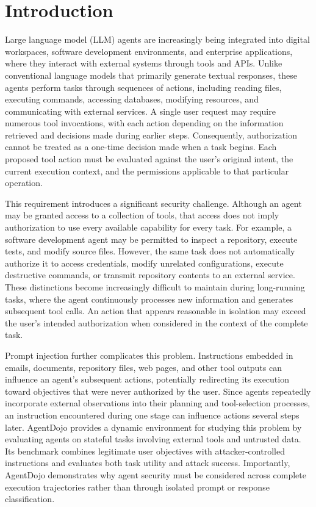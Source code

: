 \documentclass[10pt,conference]{IEEEtran}
\begin{document}
\section{Introduction}
Large language model (LLM) agents are increasingly being integrated into digital workspaces, software development environments, and enterprise applications, where they interact with external systems through tools and APIs. Unlike conventional language models that primarily generate textual responses, these agents perform tasks through sequences of actions, including reading files, executing commands, accessing databases, modifying resources, and communicating with external services. A single user request may require numerous tool invocations, with each action depending on the information retrieved and decisions made during earlier steps. Consequently, authorization cannot be treated as a one-time decision made when a task begins. Each proposed tool action must be evaluated against the user's original intent, the current execution context, and the permissions applicable to that particular operation.

This requirement introduces a significant security challenge. Although an agent may be granted access to a collection of tools, that access does not imply authorization to use every available capability for every task. For example, a software development agent may be permitted to inspect a repository, execute tests, and modify source files. However, the same task does not automatically authorize it to access credentials, modify unrelated configurations, execute destructive commands, or transmit repository contents to an external service. These distinctions become increasingly difficult to maintain during long-running tasks, where the agent continuously processes new information and generates subsequent tool calls. An action that appears reasonable in isolation may exceed the user's intended authorization when considered in the context of the complete task.

Prompt injection further complicates this problem. Instructions embedded in emails, documents, repository files, web pages, and other tool outputs can influence an agent's subsequent actions, potentially redirecting its execution toward objectives that were never authorized by the user. Since agents repeatedly incorporate external observations into their planning and tool-selection processes, an instruction encountered during one stage can influence actions several steps later. AgentDojo \cite{debenedetti2024agentdojo} provides a dynamic environment for studying this problem by evaluating agents on stateful tasks involving external tools and untrusted data. Its benchmark combines legitimate user objectives with attacker-controlled instructions and evaluates both task utility and attack success. Importantly, AgentDojo demonstrates why agent security must be considered across complete execution trajectories rather than through isolated prompt or response classification.
\end{document}
